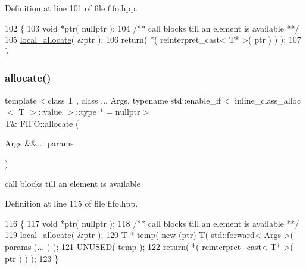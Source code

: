 Definition at line 101 of file fifo.\+hpp.


\begin{DoxyCode}
102    \{
103       \textcolor{keywordtype}{void} *ptr( \textcolor{keyword}{nullptr} );\textcolor{comment}{}
104 \textcolor{comment}{      /** call blocks till an element is available **/}
105       \hyperlink{class_f_i_f_o_a60068cb00b13626e41d4b11099354ae3}{local\_allocate}( &ptr );
106       \textcolor{keywordflow}{return}( *( reinterpret\_cast< T* >( ptr ) ) );
107    \}
\end{DoxyCode}
\hypertarget{class_f_i_f_o_af3ebfa2420677b5225794a361aa8dccc}{}\label{class_f_i_f_o_af3ebfa2420677b5225794a361aa8dccc} 
\subsubsection{\texorpdfstring{allocate()}{allocate()}\hspace{0.1cm}{\footnotesize\ttfamily [2/3]}}
{\footnotesize\ttfamily template$<$class T , class ... Args, typename std\+::enable\+\_\+if$<$ inline\+\_\+class\+\_\+alloc$<$ T $>$\+::value $>$\+::type $\ast$  = nullptr$>$ \\
T\& F\+I\+F\+O\+::allocate (\begin{DoxyParamCaption}\item[{Args \&\&...}]{params }\end{DoxyParamCaption})\hspace{0.3cm}{\ttfamily [inline]}}

call blocks till an element is available 

Definition at line 115 of file fifo.\+hpp.


\begin{DoxyCode}
116    \{
117       \textcolor{keywordtype}{void} *ptr( \textcolor{keyword}{nullptr} );\textcolor{comment}{}
118 \textcolor{comment}{      /** call blocks till an element is available **/}
119       \hyperlink{class_f_i_f_o_a60068cb00b13626e41d4b11099354ae3}{local\_allocate}( &ptr );
120       T * temp( \textcolor{keyword}{new} (ptr) T( std::forward< Args >( params )... ) );
121       UNUSED( temp );
122       \textcolor{keywordflow}{return}( *( reinterpret\_cast< T* >( ptr ) ) );
123    \}
\end{DoxyCode}
\hypertarget{class_f_i_f_o_af3ebfa2420677b5225794a361aa8dccc}{}\label{class_f_i_f_o_af3ebfa2420677b5225794a361aa8dccc} 
